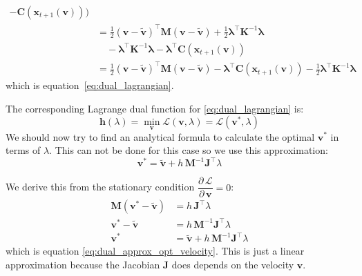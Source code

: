 \documentclass{article}
\newcommand{\pd}[2]{\dfrac{\partial\, #1}{\partial\, #2}}
\begin{document}
\begin{derivation}
\begin{equation*}
\begin{aligned}
     - \mathbf{C}(\mathbf{x}_{t+1}(\mathbf{v}))) \\[6pt]
    &= \frac{1}{2}(\mathbf{v} - \tilde{\mathbf{v}})^\top \mathbf{M} (\mathbf{v} - \tilde{\mathbf{v}})
     + \frac{1}{2}\boldsymbol{\lambda}^\top\mathbf{K}^{-1}\boldsymbol{\lambda}
     \\
    &\quad
     - \boldsymbol{\lambda}^\top\mathbf{K}^{-1}\boldsymbol{\lambda}
     - \boldsymbol{\lambda}^\top \mathbf{C}(\mathbf{x}_{t+1}(\mathbf{v})) \\[6pt]
    &= \frac{1}{2}(\mathbf{v} - \tilde{\mathbf{v}})^\top \mathbf{M} (\mathbf{v} - \tilde{\mathbf{v}})
     - \boldsymbol{\lambda}^\top \mathbf{C}(\mathbf{x}_{t+1}(\mathbf{v}))
     - \frac{1}{2}\boldsymbol{\lambda}^\top \mathbf{K}^{-1} \boldsymbol{\lambda}
\end{aligned}
\end{equation*}
%
which is equation~\eqref{eq:dual_lagrangian}.
\end{derivation}
\label{der:lagrangian_derivation_velocity}
The corresponding Lagrange dual function for \ref{eq:dual_lagrangian} is:
\begin{equation}
    \mathbf{h}(\lambda) = \min_{\mathbf{v}} \mathcal{L}(\mathbf{v}, \lambda) = \mathcal{L}(\mathbf{v}^*, \lambda)
\end{equation}
We should now try to find an analytical formula to calculate the optimal $\mathbf{v}^*$ in terms of $\lambda$. This can not be done for this case so we use this approximation:
\begin{equation}
\label{eq:dual_approx_opt_velocity}
\mathbf{v}^* = \tilde{\mathbf{v}} + h\,\mathbf{M}^{-1}\mathbf{J}^\top\lambda
\end{equation}
\begin{derivation}
We derive this from the stationary condition $\pd{\mathcal{L}}{\mathbf{v}} = 0$:
\begin{equation*}
\begin{aligned}
\mathbf{M}(\mathbf{v}^* - \tilde{\mathbf{v}}) &= h\,\mathbf{J}^\top\lambda \\
\mathbf{v}^* - \tilde{\mathbf{v}} &=  h\,\mathbf{M}^{-1}\mathbf{J}^\top\lambda \\
\mathbf{v}^* &= \tilde{\mathbf{v}} + h\,\mathbf{M}^{-1}\mathbf{J}^\top\lambda
\end{aligned}
\end{equation*}
which is equation \ref{eq:dual_approx_opt_velocity}. This is just a linear approximation because the Jacobian $\mathbf{J}$ does depends on the velocity $\mathbf{v}$.
\end{derivation}
\end{document}
